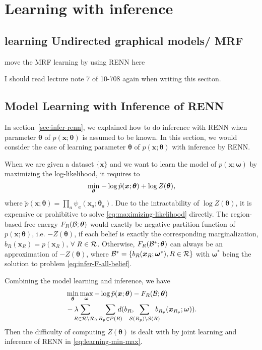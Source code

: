 \chapter{Learning with inference}


\section{learning Undirected graphical models/ MRF}
move the MRF learning by using RENN here

I should read lecture note 7 of 10-708 again when writing this seciton.

\section{Model Learning with Inference of RENN}
\label{sec:model-learning-with-renn}
In section~\ref{sec:infer-renn}, we explained how to do inference with RENN when parameter $\bm{\theta}$ of $p(\bm{x}; \bm{\theta})$ is assumed to be known. In this section, we would consider the case of learning parameter $\bm{\theta}$ of $p(\bm{x}; \bm{\theta})$ with inference by RENN.

When we are given a dataset $\{\bm{x}\}$ and we want to learn the model of $p(\bm{x}; \bm{\omega})$ by maximizing the log-likelihood, it requires to
\begin{equation}\label{eq:maximizing-likelihood}
  \underset{\bm{\theta}}{\min}\;{ -\log{\tilde{p}(\bm{x}; \bm{\theta})} + \log{Z(\bm{\theta})}},
\end{equation}
where $\tilde{p}(\bm{x}; \bm{\theta}) =  \prod_{a} \psi_a(\bm{x}_a; \bm{\theta}_a)$. Due to the intractability of $\log{Z(\bm{\theta})}$, it is expensive or prohibitive to solve \eqref{eq:maximizing-likelihood} directly. The region-based free energy $F_R(\mathcal{B};\bm{\theta})$ would exactly be negative partition function of $p(\bm{x};\bm{\theta})$, i.e. $-Z(\bm{\theta})$, if each belief is exactly the corresponding marginalization, $b_R(\bm{x}_R)=p(\bm{x}_{R})$, $\forall~R\in \mathcal{R}$. Otherwise, $F_R(\mathcal{B}^{\ast};\bm{\theta})$ can always be an approximation of $-Z(\bm{\theta})$, where $\mathcal{B}^{\ast}= \{b_R(\bm{x}_R; \bm{\omega}^{\ast}), R\in \mathcal{R}\}$ with $\bm{\omega}^{\ast}$ being the solution to problem \eqref{eq:infer-F-all-belief}.

Combining the model learning and inference, we have
\begin{align}\label{eq:learning-min-max}
  \!\!\!\!\!\!\!\!\!\!&\min_{\bm{\theta}}\max_{\bm{\omega}} -\log{\tilde{p}(\bm{x}; \bm{\theta})} - F_R(\Bb; \bm{\theta}) \nonumber \\
  &-\lambda \!\!\!\!\! \sum_{R\in \Rr \backslash \Rr_0} \sum_{R_p \in \Pp(R)}\!\!\!\!\!d( b_R, \!\!\!\!\! \sum_{\Ss(R_p)\backslash \Ss(R)}\!\!\!\!\! b_{R_p}(\bm{x}_{R_p}; \bm{\omega})).
\end{align}
Then the difficulty of computing $Z(\bm{\theta})$ is dealt with by joint learning and inference of RENN in \eqref{eq:learning-min-max}.

